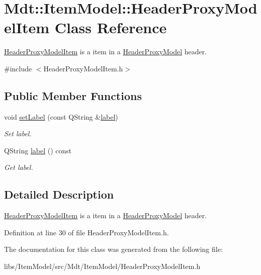 \hypertarget{class_mdt_1_1_item_model_1_1_header_proxy_model_item}{}\section{Mdt\+:\+:Item\+Model\+:\+:Header\+Proxy\+Model\+Item Class Reference}
\label{class_mdt_1_1_item_model_1_1_header_proxy_model_item}


\hyperlink{class_mdt_1_1_item_model_1_1_header_proxy_model_item}{Header\+Proxy\+Model\+Item} is a item in a \hyperlink{class_mdt_1_1_item_model_1_1_header_proxy_model}{Header\+Proxy\+Model} header.  




{\ttfamily \#include $<$Header\+Proxy\+Model\+Item.\+h$>$}

\subsection*{Public Member Functions}
\begin{DoxyCompactItemize}
\item 
void \hyperlink{class_mdt_1_1_item_model_1_1_header_proxy_model_item_a61ace9a507d1d6f2f24ab524a2d83c4f}{set\+Label} (const Q\+String \&\hyperlink{class_mdt_1_1_item_model_1_1_header_proxy_model_item_a90a0f6d786a94a091241d3398fc90273}{label})\hypertarget{class_mdt_1_1_item_model_1_1_header_proxy_model_item_a61ace9a507d1d6f2f24ab524a2d83c4f}{}\label{class_mdt_1_1_item_model_1_1_header_proxy_model_item_a61ace9a507d1d6f2f24ab524a2d83c4f}

\begin{DoxyCompactList}\small\item\em Set label. \end{DoxyCompactList}\item 
Q\+String \hyperlink{class_mdt_1_1_item_model_1_1_header_proxy_model_item_a90a0f6d786a94a091241d3398fc90273}{label} () const \hypertarget{class_mdt_1_1_item_model_1_1_header_proxy_model_item_a90a0f6d786a94a091241d3398fc90273}{}\label{class_mdt_1_1_item_model_1_1_header_proxy_model_item_a90a0f6d786a94a091241d3398fc90273}

\begin{DoxyCompactList}\small\item\em Get label. \end{DoxyCompactList}\end{DoxyCompactItemize}


\subsection{Detailed Description}
\hyperlink{class_mdt_1_1_item_model_1_1_header_proxy_model_item}{Header\+Proxy\+Model\+Item} is a item in a \hyperlink{class_mdt_1_1_item_model_1_1_header_proxy_model}{Header\+Proxy\+Model} header. 

Definition at line 30 of file Header\+Proxy\+Model\+Item.\+h.



The documentation for this class was generated from the following file\+:\begin{DoxyCompactItemize}
\item 
libs/\+Item\+Model/src/\+Mdt/\+Item\+Model/Header\+Proxy\+Model\+Item.\+h\end{DoxyCompactItemize}
